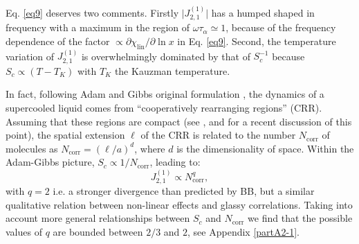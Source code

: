 \documentclass[single column,pre]{revtex4}
\begin{document}
Eq. \ref{eq9} deserves two comments. Firstly $\vert J_{2,1}^{(1)} \vert$ has a humped shaped in frequency with a maximum in the region of $\omega \tau_{\alpha} \simeq 1$, because 
of the frequency dependence of the factor $\propto \partial \chi_{\text{lin}}/\partial \ln{x}$ in Eq. \ref{eq9}. Second, the temperature variation of $J_{2,1}^{(1)}$ is overwhelmingly dominated by that of $S_c^{-1}$ because $S_c \propto (T-T_K)$ with $T_K$ the Kauzman temperature. 

In fact, following Adam and Gibbs original formulation \cite{Ada65}, the dynamics of a supercooled liquid comes from ``cooperatively rearranging regions'' (CRR). Assuming that these regions are compact (see \cite{RFOT,Gilles}, and \cite{Alb16} for a recent discussion of this point), the spatial extension $\ell$ of the CRR is related to the number $N_{\text{corr}}$ of molecules as $N_{\text{corr}} = (\ell/a)^d$, where $d$ is the dimensionality of space. Within the Adam-Gibbs picture, $S_c \propto 1/N_{\text{corr}}$, leading to:
\begin{equation}
J_{2,1}^{(1)} \propto N_{\text{corr}}^q, 
\label{eq12}
\end{equation}
with $q=2$ i.e. a stronger divergence than predicted by BB, but a similar qualitative relation between non-linear effects and glassy correlations. Taking into account more general relationships between $S_c$  and $N_{\text{corr}}$ we find that the possible values of $q$ are bounded between $2/3$ and $2$, see Appendix \ref{partA2-1}.
\end{document}
